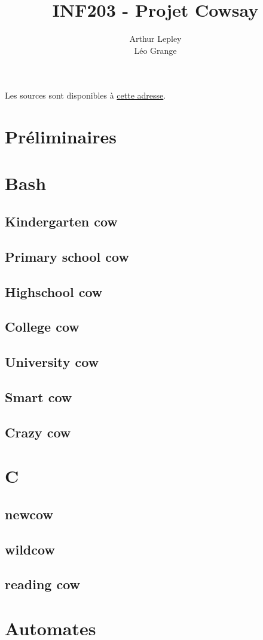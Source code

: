 \documentclass[french, 10pt, a4paper]{article}
\title{INF203 - Projet Cowsay}
\author{
	Arthur Lepley\\
	Léo Grange
}
\begin{document}
\maketitle

Les sources sont disponibles à \href{https://github.com/ArtichOwO/INF203-Projet}{cette adresse}.

\tableofcontents

\section{Préliminaires}


\section{Bash}

\subsection{Kindergarten cow}

\subsection{Primary school cow}

\subsection{Highschool cow}

\subsection{College cow}

\subsection{University cow}

\subsection{Smart cow}

\subsection{Crazy cow}


\section{C}

\subsection{newcow}

\subsection{wildcow}

\subsection{reading cow}


\section{Automates}
\end{document}
